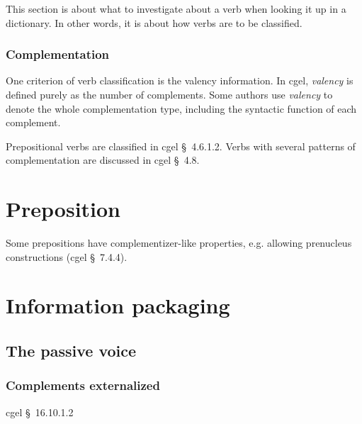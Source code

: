 \documentclass{article}
\newcommand*{\citesec}[1]{\S~{#1}}
\newcommand*{\term}[1]{\emph{#1}}
\begin{document}
This section is about what to investigate about a verb when looking it up in a dictionary.
In other words, it is about how verbs are to be classified.

\subsubsection{Complementation}\label{sec:dict-comp}

One criterion of verb classification is the valency information.
In \ac{cgel}, \term{valency} is defined purely as the number of complements.
Some authors use \term{valency} to denote the whole complementation type,
including the syntactic function of each complement.

Prepositional verbs are classified in \ac{cgel} \citesec{4.6.1.2}.
Verbs with several patterns of complementation are discussed in \ac{cgel} \citesec{4.8}.

\section{Preposition}

Some prepositions have complementizer-like properties,
e.g. allowing prenucleus constructions (\ac{cgel} \citesec{7.4.4}).

\section{Information packaging}

\subsection{The passive voice}

\subsubsection{Complements externalized}\label{sec:externalized-passive}

\ac{cgel} \citesec{16.10.1.2}



\end{document}
